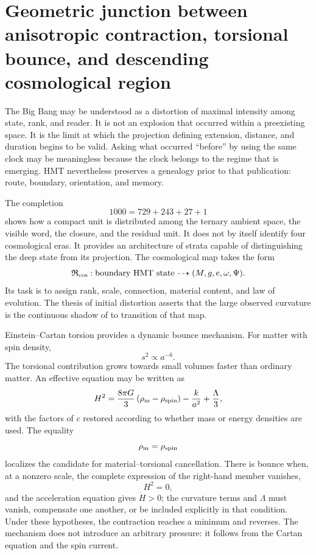 \section{Geometric junction between anisotropic contraction, torsional bounce, and descending cosmological region}

The Big Bang may be understood as a distortion of maximal intensity among state,
rank, and reader. It is not an explosion that occurred within a preexisting space. It is the
limit at which the projection defining extension, distance, and duration begins to
be valid. Asking what occurred “before” by using the same clock may be
meaningless because the clock belongs to the regime that is emerging. HMT nevertheless
preserves a genealogy prior to that publication: route, boundary, orientation, and
memory.

The completion
\[
 1000=729+243+27+1
\]
shows how a compact unit is distributed among the ternary ambient space, the visible
word, the closure, and the residual unit. It does not by itself identify four
cosmological eras. It provides an architecture of strata capable of distinguishing the
deep state from its projection. The cosmological map takes the form
\[
 \mathfrak R_{\rm cos}:
 \text{boundary HMT state}
 \dashrightarrow
 (M,g,e,\omega,\Psi).
\]
Its task is to assign rank, scale, connection, material content, and law of evolution.
The thesis of initial distortion asserts that the large observed curvature is the continuous shadow
of to transition of that map.

Einstein--Cartan torsion provides a dynamic bounce mechanism. For
matter with spin density,
\[
 s^2\propto a^{-6}.
\]
The torsional contribution grows towards small volumes faster than ordinary
matter. An effective equation may be written as
\[
 H^2
 =
 \frac{8\pi G}{3}
 \left(\rho_{\rm m}-\rho_{\rm spin}\right)
 -
 \frac{k}{a^2}
 +
 \frac{\Lambda}{3},
\]
with the factors of \(c\) restored according to whether mass or
energy densities are used. The equality
\[
 \rho_{\rm m}=\rho_{\rm spin}
\]
localizes the candidate for material--torsional cancellation. There is bounce when, at a
nonzero scale, the complete expression of the right-hand member vanishes,
\[
 H^2=0,
\]
and the acceleration equation gives \(\dot H>0\); the curvature terms and
\(\Lambda\) must vanish, compensate one another, or be included explicitly in that condition.
Under these hypotheses, the contraction reaches a minimum and reverses. The mechanism
does not introduce an arbitrary pressure: it follows from the Cartan equation and the
spin current.

